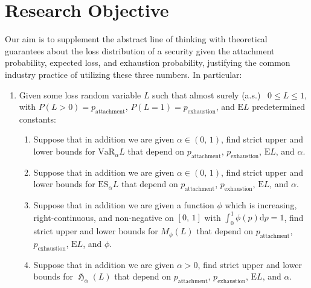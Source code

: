 \documentclass{amsart}
\theoremstyle{plain}
\theoremstyle{definition}
\theoremstyle{definition}
\theoremstyle{remark}
\DeclareMathOperator{\esscher}{\mathfrak{H}}
\begin{document}
\section{Research Objective}
Our aim is to supplement the abstract line of thinking with theoretical guarantees about the loss distribution of a security given the attachment probability, expected loss, and exhaustion probability, justifying the common industry practice of utilizing these three numbers. In particular:
\begin{enumerate}
    \item Given some loss random variable \(L\) such that almost surely (a.s.) \ \(0 \leq L \leq 1\), with \(P \left(L > 0\right) = p_{\text{attachment}}\), \(P \left(L = 1\right) = p_{\text{exhaustion}}\), and \(\mathrm{E}L\) predetermined constants:
        \begin{enumerate}
            \item Suppose that in addition we are given \(\alpha \in \left(0,\,1\right)\), find strict upper and lower bounds for \(\text{VaR}_{\alpha}L\) that depend on \(p_{\text{attachment}}\), \(p_{\text{exhaustion}}\), \(\mathrm{E}L\), and \(\alpha\).
            \item Suppose that in addition we are given \(\alpha \in \left(0,\,1\right)\), find strict upper and lower bounds for \(\text{ES}_{\alpha}L\) that depend on \(p_{\text{attachment}}\), \(p_{\text{exhaustion}}\), \(\mathrm{E}L\), and \(\alpha\).
            \item Suppose that in addition we are given a function \(\phi\) which is increasing, right-continuous, and non-negative on \(\left[0,\,1\right]\) with \(\int_{0}^{1} \phi \left(p\right)\mathrm{d}p = 1\), find strict upper and lower bounds for \(M_{\phi}\left(L\right)\) that depend on \(p_{\text{attachment}}\), \(p_{\text{exhaustion}}\), \(\mathrm{E}L\), and \(\phi\).
            \item Suppose that in addition we are given \(\alpha > 0\), find strict upper and lower bounds for \(\esscher_{\alpha}\left(L\right)\) that depend on \(p_{\text{attachment}}\), \(p_{\text{exhaustion}}\), \(\mathrm{E}L\), and \(\alpha\).
            

\end{enumerate}
\end{enumerate}
\end{document}

